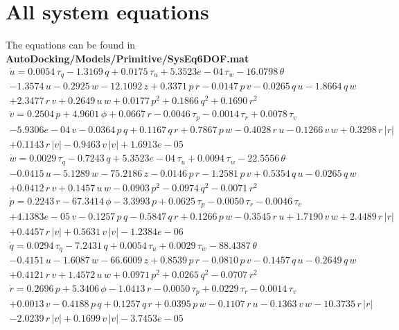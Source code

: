 \documentclass[12pt,a4]{article}
\begin{document}
\section{All system equations}
The equations can be found in \textbf{AutoDocking/Models/Primitive/SysEq6DOF.mat}
\begin{multline}
	\dot{u} = 0.0054\,\tau _{q}-1.3169\,q+0.0175\,\tau _{u}+5.3523e-04\,\tau _{w}-16.0798\,\theta \\-1.3574\,u-0.2925\,w-12.1092\,z+0.3371\,p\,r-0.0147\,p\,v-0.0265\,q\,u-1.8664\,q\,w\\+2.3477\,r\,v+0.2649\,u\,w+0.0177\,p^2+0.1866\,q^2+0.1690\,r^2
\end{multline}
\begin{multline}
	\dot{v} = 0.2504\,p+4.9601\,\phi +0.0667\,r-0.0046\,\tau _{p}-0.0014\,\tau _{r}+0.0078\,\tau _{v}\\-5.9306e-04\,v-0.0364\,p\,q+0.1167\,q\,r+0.7867\,p\,w-0.4028\,r\,u-0.1266\,v\,w+0.3298\,r\,\left|r\right|\\+0.1143\,r\,\left|v\right|-0.9463\,v\,\left|v\right|+1.6913e-05
\end{multline}
\begin{multline}
	\dot{w} = 0.0029\,\tau _{q}-0.7243\,q+5.3523e-04\,\tau _{u}+0.0094\,\tau _{w}-22.5556\,\theta \\-0.0415\,u-5.1289\,w-75.2186\,z-0.0146\,p\,r-1.2581\,p\,v+0.5354\,q\,u-0.0265\,q\,w\\+0.0412\,r\,v+0.1457\,u\,w-0.0903\,p^2-0.0974\,q^2-0.0071\,r^2
\end{multline}
\begin{multline}
	\dot{p} = 0.2243\,r-67.3414\,\phi -3.3993\,p+0.0625\,\tau _{p}-0.0050\,\tau _{r}-0.0046\,\tau _{v}\\+4.1383e-05\,v-0.1257\,p\,q-0.5847\,q\,r+0.1266\,p\,w-0.3545\,r\,u+1.7190\,v\,w+2.4489\,r\,\left|r\right|\\+0.4457\,r\,\left|v\right|+0.5631\,v\,\left|v\right|-1.2384e-06
\end{multline}
\begin{multline}
	\dot{q} = 0.0294\,\tau _{q}-7.2431\,q+0.0054\,\tau _{u}+0.0029\,\tau _{w}-88.4387\,\theta \\-0.4151\,u-1.6087\,w-66.6009\,z+0.8539\,p\,r-0.0810\,p\,v-0.1457\,q\,u-0.2649\,q\,w\\+0.4121\,r\,v+1.4572\,u\,w+0.0971\,p^2+0.0265\,q^2-0.0707\,r^2
\end{multline}
\begin{multline}
	\dot{r} = 0.2696\,p+5.3406\,\phi -1.0413\,r-0.0050\,\tau _{p}+0.0229\,\tau _{r}-0.0014\,\tau _{v}\\+0.0013\,v-0.4188\,p\,q+0.1257\,q\,r+0.0395\,p\,w-0.1107\,r\,u-0.1363\,v\,w-10.3735\,r\,\left|r\right|\\-2.0239\,r\,\left|v\right|+0.1699\,v\,\left|v\right|-3.7453e-05
\end{multline}
\end{document}
